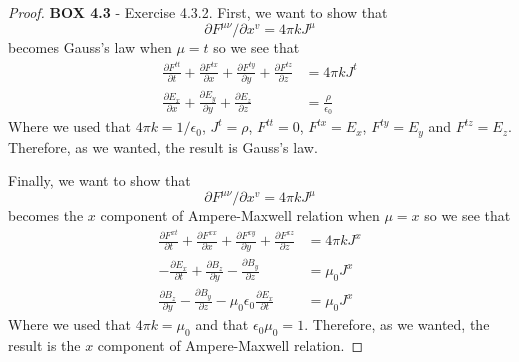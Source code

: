 \documentclass[11pt]{article}
\theoremstyle{definition}
\begin{document}
\begin{proof}{\textbf{BOX 4.3} - Exercise 4.3.2.}
    First, we want to show that
    $$\partial F^{\mu\nu}/\partial x^v = 4\pi kJ^{\mu}$$
    becomes Gauss's law when $\mu = t$ so we see that
    \begin{align*}
        \frac{\partial F^{tt}}{\partial t} + \frac{\partial F^{tx}}{\partial x}
        + \frac{\partial F^{ty}}{\partial y} + \frac{\partial F^{tz}}{\partial z}
        &= 4\pi kJ^t\\
        \frac{\partial E_x}{\partial x}
        + \frac{\partial E_y}{\partial y} + \frac{\partial E_z}{\partial z}
        &= \frac{\rho}{\epsilon_0}
    \end{align*} 
    Where we used that $4\pi k = 1/\epsilon_0$, $J^t = \rho$, $F^{tt} = 0$,
    $F^{tx} = E_x$, $F^{ty} = E_y$ and $F^{tz} = E_z$. Therefore, as we wanted,
    the result is Gauss's law.

    Finally, we want to show that
    $$\partial F^{\mu\nu}/\partial x^v = 4\pi kJ^{\mu}$$
    becomes the $x$ component of Ampere-Maxwell relation when
    $\mu = x$ so we see that
    \begin{align*}
        \frac{\partial F^{xt}}{\partial t} + \frac{\partial F^{xx}}{\partial x}
        + \frac{\partial F^{xy}}{\partial y} + \frac{\partial F^{xz}}{\partial z}
        &= 4\pi kJ^x\\
        -\frac{\partial E_x}{\partial t}
        + \frac{\partial B_z}{\partial y} -\frac{\partial B_y}{\partial z}
        &= \mu_0J^x\\
        \frac{\partial B_z}{\partial y} -\frac{\partial B_y}{\partial z}
        - \mu_0\epsilon_0\frac{\partial E_x}{\partial t}
        &= \mu_0J^x
    \end{align*} 
    Where we used that $4\pi k = \mu_0$ and that $\epsilon_0\mu_0 = 1$.
    Therefore, as we wanted, the result is the $x$ component of Ampere-Maxwell
    relation.
\end{proof}
\end{document}
